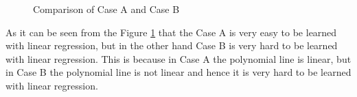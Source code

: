 \documentclass[a4paper]{article}
\begin{document}
\begin{enumerate}
	      \begin{figure}[H]
		      \centering
		      \hfill
		      \caption{Comparison of Case A and Case B} 
		      \label{fig:question10}
	      \end{figure}
	      As it can be seen from the Figure \ref{fig:question10} that the Case A is very easy to be learned with linear regression, but in the other hand Case B is very hard to be learned with linear regression. This is because in Case A the polynomial line is linear, but in Case B the polynomial line is not linear and hence it is very hard to be learned with linear regression.


\end{enumerate}
\end{document}
